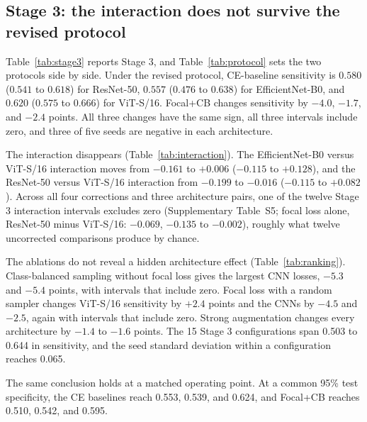 \documentclass[11pt]{article}
\begin{document}
\subsection{Stage 3: the interaction does not survive the revised protocol}

Table~\ref{tab:stage3} reports Stage 3, and Table~\ref{tab:protocol} sets the two protocols side by side. Under the revised protocol, CE-baseline sensitivity is $0.580$ ($0.541$ to $0.618$) for ResNet-50, $0.557$ ($0.476$ to $0.638$) for EfficientNet-B0, and $0.620$ ($0.575$ to $0.666$) for ViT-S/16. Focal+CB changes sensitivity by $-4.0$, $-1.7$, and $-2.4$ points. All three changes have the same sign, all three intervals include zero, and three of five seeds are negative in each architecture.

The interaction disappears (Table~\ref{tab:interaction}). The EfficientNet-B0 versus ViT-S/16 interaction moves from $-0.161$ to $+0.006$ ($-0.115$ to $+0.128$), and the ResNet-50 versus ViT-S/16 interaction from $-0.199$ to $-0.016$ ($-0.115$ to $+0.082$). Across all four corrections and three architecture pairs, one of the twelve Stage 3 interaction intervals excludes zero (Supplementary Table~S5; focal loss alone, ResNet-50 minus ViT-S/16: $-0.069$, $-0.135$ to $-0.002$), roughly what twelve uncorrected comparisons produce by chance.

The ablations do not reveal a hidden architecture effect (Table~\ref{tab:ranking}). Class-balanced sampling without focal loss gives the largest CNN losses, $-5.3$ and $-5.4$ points, with intervals that include zero. Focal loss with a random sampler changes ViT-S/16 sensitivity by $+2.4$ points and the CNNs by $-4.5$ and $-2.5$, again with intervals that include zero. Strong augmentation changes every architecture by $-1.4$ to $-1.6$ points. The 15 Stage 3 configurations span 0.503 to 0.644 in sensitivity, and the seed standard deviation within a configuration reaches 0.065.

The same conclusion holds at a matched operating point. At a common 95\% test specificity, the CE baselines reach 0.553, 0.539, and 0.624, and Focal+CB reaches 0.510, 0.542, and 0.595.
\end{document}

